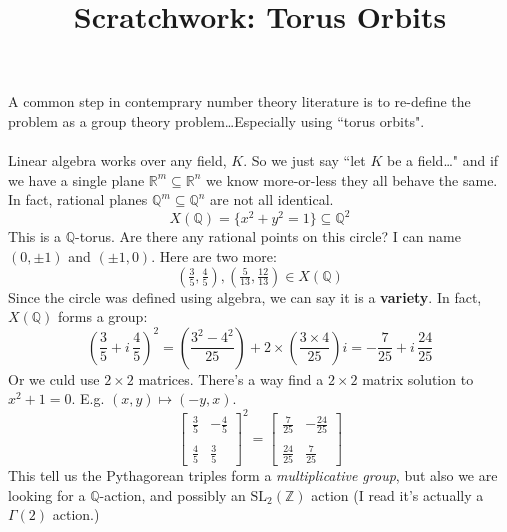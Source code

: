 \documentclass[12pt]{article}
\title{Scratchwork: Torus Orbits}
\date{}
\begin{document}

\sffamily

\maketitle

\noindent A common step in contemprary number theory literature is to re-define the problem as a group theory problem\dots Especially using ``torus orbits".  \\ \\
Linear algebra works over any field, $K$.  So we just say ``let $K$ be a field\dots" and if we have a single plane $\mathbb{R}^m \subseteq \mathbb{R}^n$ we know more-or-less they all behave the same.  In fact, rational planes $\mathbb{Q}^m \subseteq \mathbb{Q}^n$ are not all identical.
$$ X(\mathbb{Q}) = \{ x^2 + y^2 = 1 \}  \subseteq \mathbb{Q}^2 $$
This is a $\mathbb{Q}$-torus.  Are there any rational points on this circle?  I can name $(0,\pm1)$ and $(\pm 1,0)$.  Here are two more:
$$ (\tfrac{3}{5}, \tfrac{4}{5}) , (\tfrac{5}{13}, \tfrac{12}{13}) \in X(\mathbb{Q}) $$
Since the circle was defined using algebra, we can say it is a \textbf{variety}.  In fact, $X(\mathbb{Q})$ forms a group:
$$ \left(\frac{3}{5} + i \, \frac{4}{5}\right)^2 
=  \left(\frac{3^2 - 4^2 }{25}\right) + 2 \times\left( \frac{3 \times 4}{25} \right)i =  - \frac{7}{25} + i \, \frac{24}{25}$$
Or we culd use $2 \times 2$ matrices.  There's a way find a $2 \times 2$ matrix solution to $x^2 + 1 = 0$. E.g. $(x,y) \mapsto (-y,x)$.
$$ \left[ 
\begin{array}{rr} \frac{3}{5} & -\frac{4}{5} \\  \\
\frac{4}{5} & \frac{3}{5} 
\end{array}
\right]^2 = \left[ 
\begin{array}{rr} \frac{7}{25} & -\frac{24}{25} \\ \\
\frac{24}{25} & \frac{7}{25} 
\end{array}
\right]$$
This tell us the Pythagorean triples form a \textit{multiplicative group}, but also we are looking for a $\mathbb{Q}$-action, and possibly an $\text{SL}_2(\mathbb{Z})$ action (I read it's actually a $\Gamma(2)$ action.)\\
 \\
\end{document}
